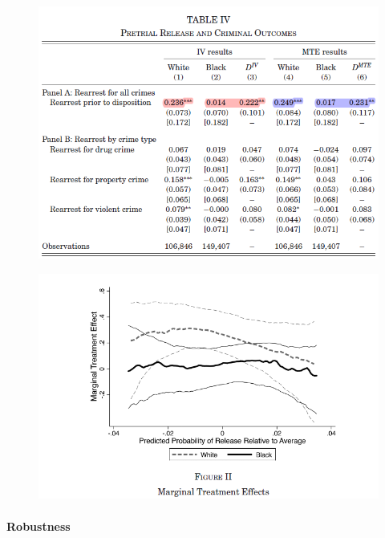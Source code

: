 \documentclass[../root]{subfiles}
\begin{document}
    \begin{figure}[h]
      \centering
      \includegraphics[scale = 1]{os0707tanji/ADY_T4}
    \end{figure}

    \begin{figure}[h]
      \centering
      \includegraphics[scale = 1]{os0707tanji/ADY_F2}
    \end{figure}

    \paragraph{Robustness}
\end{document}
